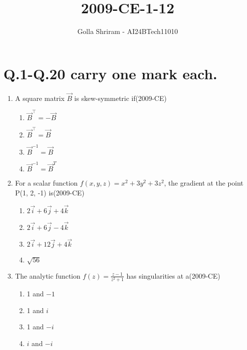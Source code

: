 \documentclass[journal,12pt,twocolumn]{IEEEtran}
\theoremstyle{remark}
\begin{document}

\vspace{3cm}
\title{ 2009-CE-1-12 }
\author{Golla Shriram - AI24BTech11010}

\maketitle

\renewcommand{\thefigure}{\theenumi}
\renewcommand{\thetable}{\theenumi}

\section{ Q.1-Q.20 carry one mark each. }
                                                                           
 \begin{enumerate}
		 
	 \item A square matrix $\vec{B}$ is skew-symmetric if\hfill{(2009-CE)}

 \begin{enumerate}
  \item $\vec{B}^{\top} = - \vec{B}$
  \item $\vec{B}^{\top} = \vec{B}$
  \item $\vec{B}^{-1} =  \vec{B}$
  \item $\vec{B}^{-1} =  \vec{B}^{T}$
 \end{enumerate}

\item For a scalar function $f(x,y,z) = x^2+3y^2+3z^2$, the gradient at the point P(1, 2, -1) is\hfill{(2009-CE)}

\begin{enumerate}
	\item $2\overrightarrow{i}+6\overrightarrow{j}+4\overrightarrow{k} $
	\item $2\overrightarrow{i}+6\overrightarrow{j}-4\overrightarrow{k} $
	\item $2\overrightarrow{i}+12\overrightarrow{j}+4\overrightarrow{k} $
	\item $\sqrt{56}$
\end{enumerate}

\item The analytic function $f(z) = \frac{z-1}{z^{2}+1}$ has singularities at a\hfill{(2009-CE)}

	\begin{enumerate}
	\item 1 and $-1$
	\item 1 and $i$
	\item 1 and $-i$
	\item $i$ and $-i$
	\end{enumerate}



\end{enumerate}
\end{document}
